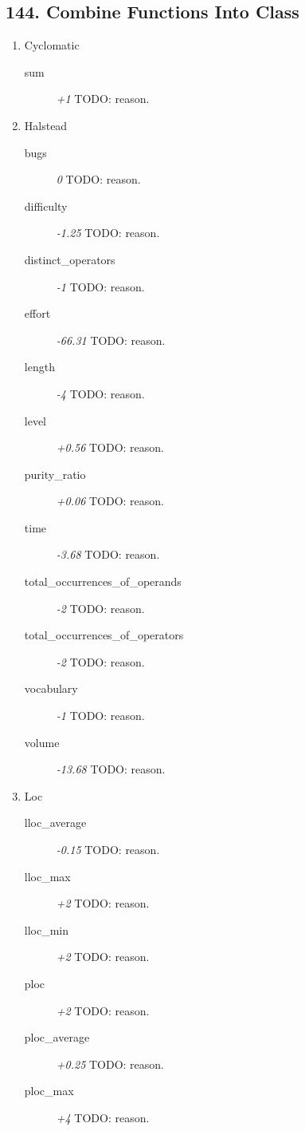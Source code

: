 \subsection{144. Combine Functions Into Class}

\begin{enumerate}
  \item Cyclomatic
        \begin{description}
          \item [sum] \textit{+1} TODO: reason.
        \end{description}
  \item Halstead
        \begin{description}
          \item [bugs] \textit{0} TODO: reason.
          \item [difficulty] \textit{-1.25} TODO: reason.
          \item [distinct\_operators] \textit{-1} TODO: reason.
          \item [effort] \textit{-66.31} TODO: reason.
          \item [length] \textit{-4} TODO: reason.
          \item [level] \textit{+0.56} TODO: reason.
          \item [purity\_ratio] \textit{+0.06} TODO: reason.
          \item [time] \textit{-3.68} TODO: reason.
          \item [total\_occurrences\_of\_operands] \textit{-2} TODO: reason.
          \item [total\_occurrences\_of\_operators] \textit{-2} TODO: reason.
          \item [vocabulary] \textit{-1} TODO: reason.
          \item [volume] \textit{-13.68} TODO: reason.
        \end{description}
  \item Loc
        \begin{description}
          \item [lloc\_average] \textit{-0.15} TODO: reason.
          \item [lloc\_max] \textit{+2} TODO: reason.
          \item [lloc\_min] \textit{+2} TODO: reason.
          \item [ploc] \textit{+2} TODO: reason.
          \item [ploc\_average] \textit{+0.25} TODO: reason.
          \item [ploc\_max] \textit{+4} TODO: reason.

\end{description}
\end{enumerate}

